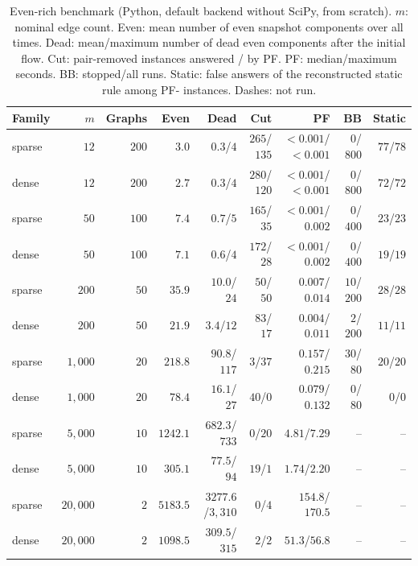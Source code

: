 \begin{table}[!t]
\caption{Even-rich benchmark (Python, default backend without SciPy, from scratch). $m$: nominal edge count. Even: mean number of even snapshot components over all times. Dead: mean/maximum number of dead even components after the initial flow. Cut: pair-removed instances answered \YES{}/\NO{} by PF. PF: median/maximum seconds. BB: stopped/all runs. Static: false \YES{} answers of the reconstructed static rule among PF-\NO{} \FIX{} instances. Dashes: not run.}
\label{tab:even}
\scriptsize
\setlength{\tabcolsep}{2.5pt}
\begin{tabular*}{\textwidth}{@{\extracolsep\fill}lrrrrrrrr}
\toprule
Family & $m$ & Graphs & Even & Dead & Cut & PF & BB & Static \\
\midrule
sparse & $12$ & $200$ & $3.0$ & $0.3$/$4$ & $265$/$135$ & $<0.001$/$<0.001$ & $0$/$800$ & $77$/$78$ \\
dense & $12$ & $200$ & $2.7$ & $0.3$/$4$ & $280$/$120$ & $<0.001$/$<0.001$ & $0$/$800$ & $72$/$72$ \\
sparse & $50$ & $100$ & $7.4$ & $0.7$/$5$ & $165$/$35$ & $<0.001$/$0.002$ & $0$/$400$ & $23$/$23$ \\
dense & $50$ & $100$ & $7.1$ & $0.6$/$4$ & $172$/$28$ & $<0.001$/$0.002$ & $0$/$400$ & $19$/$19$ \\
sparse & $200$ & $50$ & $35.9$ & $10.0$/$24$ & $50$/$50$ & $0.007$/$0.014$ & $10$/$200$ & $28$/$28$ \\
dense & $200$ & $50$ & $21.9$ & $3.4$/$12$ & $83$/$17$ & $0.004$/$0.011$ & $2$/$200$ & $11$/$11$ \\
sparse & $1{,}000$ & $20$ & $218.8$ & $90.8$/$117$ & $3$/$37$ & $0.157$/$0.215$ & $30$/$80$ & $20$/$20$ \\
dense & $1{,}000$ & $20$ & $78.4$ & $16.1$/$27$ & $40$/$0$ & $0.079$/$0.132$ & $0$/$80$ & $0$/$0$ \\
sparse & $5{,}000$ & $10$ & $1242.1$ & $682.3$/$733$ & $0$/$20$ & $4.81$/$7.29$ & -- & -- \\
dense & $5{,}000$ & $10$ & $305.1$ & $77.5$/$94$ & $19$/$1$ & $1.74$/$2.20$ & -- & -- \\
sparse & $20{,}000$ & $2$ & $5183.5$ & $3277.6$/$3{,}310$ & $0$/$4$ & $154.8$/$170.5$ & -- & -- \\
dense & $20{,}000$ & $2$ & $1098.5$ & $309.5$/$315$ & $2$/$2$ & $51.3$/$56.8$ & -- & -- \\
\bottomrule
\end{tabular*}
\end{table}

